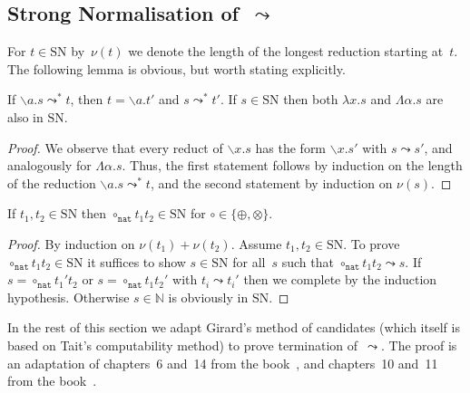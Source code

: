 \documentclass[a4paper,UKenglish,cleveref,autoref,numberwithinsect]{lipics-v2019}
\theoremstyle{definition}
\newcommand{\abstraction}[2]{\backslash #1.#2}
\newcommand{\abs}[2]{\lambda #1.#2}
\newcommand{\tabs}[2]{\Lambda #1.#2}
\newcommand{\arrW}{\leadsto}
\newcommand{\nat}{\mathtt{nat}}
\newcommand{\SN}{\mathrm{SN}}
\begin{document}
\subsection{Strong Normalisation of~$\arrW$}

For $t \in \SN$ by~$\nu(t)$ we denote the length of the longest
reduction starting at~$t$. The following lemma is obvious, but worth
stating explicitly.

\begin{lemma}\label{lem_reduce_abs}
  If $\abstraction{a}{s} \arrW^* t$, then $t = \abstraction{a}{t'}$
  and $s \arrW^* t'$.  If $s \in \SN$ then both $\abs{x}{s}$ and
  $\tabs{\alpha}{s}$ are also in $\SN$.
\end{lemma}

\begin{proof}
  We observe that every reduct of $\abstraction{x}{s}$ has the form
  $\abstraction{x}{s'}$ with $s \arrW s'$, and analogously for
  $\tabs{\alpha}{s}$.  Thus, the first statement follows by induction
  on the length of the reduction $\abstraction{a}{s} \arrW^* t$,
  and the second statement by induction on $\nu(s)$.
\end{proof}

\begin{lemma}\label{lem_circ_sn_base}
  If $t_1,t_2 \in \SN$ then $\circ_\nat t_1 t_2 \in \SN$ for $\circ
  \in \{\oplus,\otimes\}$.
\end{lemma}

\begin{proof}
  By induction on $\nu(t_1) + \nu(t_2)$. Assume $t_1,t_2 \in \SN$. To
  prove $\circ_\nat t_1 t_2 \in \SN$ it suffices to show $s \in \SN$
  for all~$s$ such that $\circ_\nat t_1 t_2 \arrW s$. If $s =
  \circ_\nat t_1' t_2$ or $s = \circ_\nat t_1 t_2'$ with $t_i \arrW
  t_i'$ then we complete by the induction hypothesis. Otherwise $s \in
  \mathbb{N}$ is obviously in $\SN$.
\end{proof}

In the rest of this section we adapt Girard's method of candidates
(which itself is based on Tait's computability method) to prove
termination of~$\arrW$. The proof is an adaptation of chapters~6
and~14 from the book~\cite{Girard1989}, and chapters~10 and~11 from
the book~\cite{SorensenUrzyczyn2006}.
\end{document}
